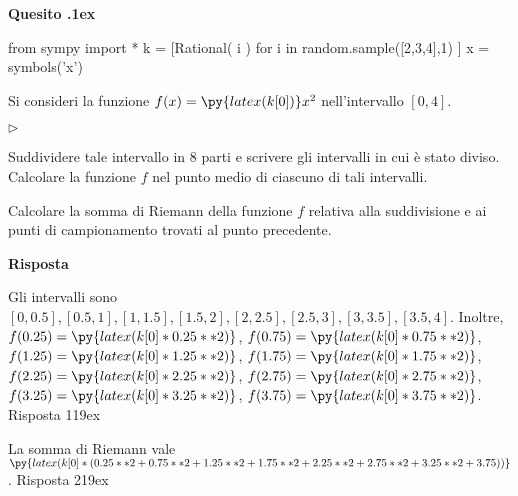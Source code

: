 \documentclass[11pt,twoside,a4paper]{article}
\newcommand{\mylabel}[1]{#1\hfill}
\renewenvironment{itemize}
  {\begin{list}{$\triangleright$}{%
   \setlength{\parskip}{0mm}
   \setlength{\topsep}{.4\baselineskip}
   \setlength{\rightmargin}{0mm}
   \setlength{\listparindent}{0mm}
   \setlength{\itemindent}{0mm}
   \setlength{\labelwidth}{2ex}
   \setlength{\itemsep}{.4\baselineskip}
   \setlength{\parsep}{0mm}
   \setlength{\partopsep}{0mm}
   \setlength{\labelsep}{1ex}
   \setlength{\leftmargin}{\labelwidth+\labelsep}
   \let\makelabel\mylabel}}{%
   \end{list}\vspace*{-1.3mm}}
\newcounter{quesito}
\newenvironment{question}{\bigskip\addtocounter{quesito}{1}\bigskip\bigskip\par\textbf{Quesito \thequesito.\kern1ex}}{\vspace{\parskip}}
\newenvironment{answer}{\par\textbf{Risposta\quad}}{\vspace{\parskip}}
\begin{document}
\begin{question}
\begin{pycode}
from sympy import *
k = [Rational( i ) for i in random.sample([2,3,4],1) ]
x = symbols('x')
\end{pycode}
Si consideri la funzione $f(x) = \py{latex(k[0])}x^2$ nell'intervallo $[0,4]$.
\begin{itemize}
\item[1.] Suddividere tale intervallo in $8$ parti e scrivere gli intervalli in cui \`e stato diviso. Calcolare la funzione $f$ nel punto medio di ciascuno di tali intervalli.
\item[2.] Calcolare la somma di Riemann della funzione $f$ relativa alla suddivisione e ai punti di campionamento trovati al punto precedente.
\end{itemize}
\begin{answer}

{\color{blue}
Gli intervalli sono $[0, 0.5], [0.5, 1], [1, 1.5], [1.5, 2], [2, 2.5], [2.5, 3], [3, 3.5], [3.5, 4]$.
Inoltre, $f(0.25) = \py{latex(k[0]*0.25**2)}$, $f(0.75) = \py{latex(k[0]*0.75**2)}$, $f(1.25) = \py{latex(k[0]*1.25**2)}$, $f(1.75) = \py{latex(k[0]*1.75**2)}$, $f(2.25) = \py{latex(k[0]*2.25**2)}$, $f(2.75) = \py{latex(k[0]*2.75**2)}$, $f(3.25) = \py{latex(k[0]*3.25**2)}$, $f(3.75) = \py{latex(k[0]*3.75**2)}$.
\hfill Risposta 1\kern19ex}

\smallskip
{\color{blue}La somma di Riemann vale $\py{latex(k[0]*(0.25**2+0.75**2+1.25**2+1.75**2+2.25**2+2.75**2+3.25**2+3.75))}$.
\hfill Risposta 2\kern19ex}

\end{answer}
\end{question}
\end{document}
